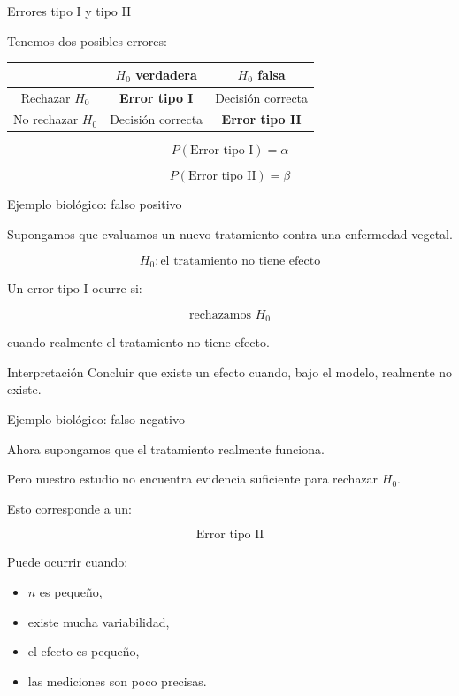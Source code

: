 \documentclass[aspectratio=169,11pt]{beamer}
\begin{document}
\begin{frame}{Errores tipo I y tipo II}

Tenemos dos posibles errores:

\begin{center}
\begin{tabular}{c|cc}
& $H_0$ verdadera & $H_0$ falsa\\
\hline
Rechazar $H_0$ &
\textbf{Error tipo I} &
Decisión correcta\\
No rechazar $H_0$ &
Decisión correcta &
\textbf{Error tipo II}
\end{tabular}
\end{center}

\vspace{0.3cm}

\[
P(\text{Error tipo I})=\alpha
\]

\[
P(\text{Error tipo II})=\beta
\]

\end{frame}

\begin{frame}{Ejemplo biológico: falso positivo}

Supongamos que evaluamos un nuevo tratamiento contra una enfermedad vegetal.

\[
H_0:\text{el tratamiento no tiene efecto}
\]

Un error tipo I ocurre si:

\[
\text{rechazamos }H_0
\]

cuando realmente el tratamiento no tiene efecto.

\begin{block}{Interpretación}
Concluir que existe un efecto cuando, bajo el modelo, realmente
no existe.
\end{block}

\end{frame}

\begin{frame}{Ejemplo biológico: falso negativo}

Ahora supongamos que el tratamiento realmente funciona.

Pero nuestro estudio no encuentra evidencia suficiente para rechazar $H_0$.

Esto corresponde a un:

\[
\boxed{\text{Error tipo II}}
\]

Puede ocurrir cuando:

\begin{itemize}
    \item $n$ es pequeño,
    \item existe mucha variabilidad,
    \item el efecto es pequeño,
    \item las mediciones son poco precisas.
\end{itemize}

\end{frame}
\end{document}
